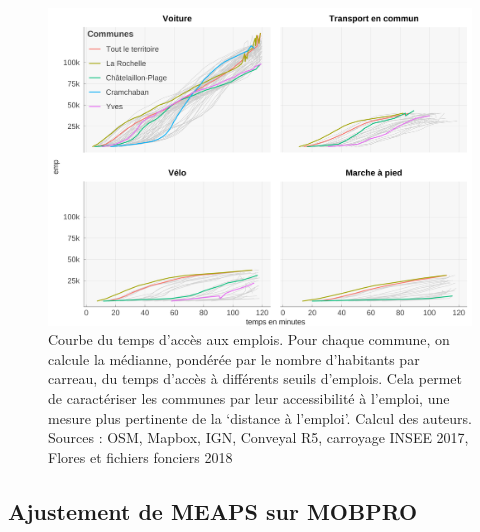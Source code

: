 \documentclass[
  10pt,
  a4paper,
  numbers=noendperiod,
  DIV=9]{scrreprt}
\begin{document}
\begin{figure}[htb]

{\centering \includegraphics[width=1\textwidth,height=\textheight]{./output/access_par_com.png}

}

\caption[Accessibilité par communes pour la
Rochelle]{\label{fig-comaccess}Courbe du temps d'accès aux emplois. Pour
chaque commune, on calcule la médianne, pondérée par le nombre
d'habitants par carreau, du temps d'accès à différents seuils d'emplois.
Cela permet de caractériser les communes par leur accessibilité à
l'emploi, une mesure plus pertinente de la `distance à l'emploi'. Calcul
des auteurs. Sources : OSM, Mapbox, IGN, Conveyal R5, carroyage INSEE
2017, Flores et fichiers fonciers 2018}

\end{figure}

\hypertarget{sec-ajust}{%
\subsection{Ajustement de MEAPS sur MOBPRO}\label{sec-ajust}}
\end{document}
